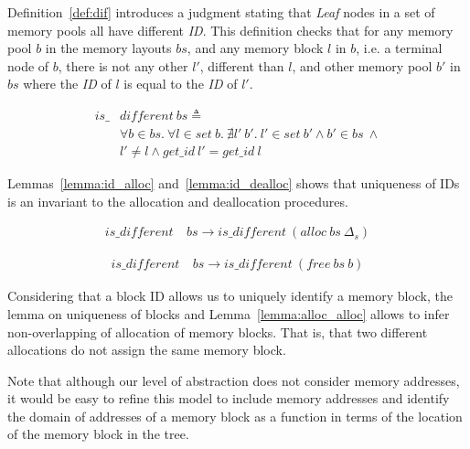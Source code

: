 Definition~\ref{def:dif} introduces a judgment stating that \emph{Leaf} nodes in a set of memory pools all have different \emph{ID}. This definition checks that for any memory pool $b$ in the memory layouts $bs$, and any memory block $l$ in $b$, i.e. a terminal node of $b$, there is not any other $l'$, different than $l$, and other memory pool $b'$ in $bs$ where the \emph{ID} of $l$ is equal to the \emph{ID} of $l'$.

\begin{definition} 
\label{def:dif}
\end{definition}
\vspace{-7pt}
\begin{align*}
is\_&different\ bs \triangleq\\
&\forall b \in bs.\ \forall l \in set\ b.\ \nexists l'\ b'.\ l' \in set\ b' \wedge b' \in bs\ \wedge\\
&l' \ne l \wedge get\_id\ l' = get\_id\ l
\end{align*}
\vspace{-12pt}

Lemmas~\ref{lemma:id_alloc} and~\ref{lemma:id_dealloc} shows that uniqueness of IDs is an invariant to the allocation and deallocation procedures.

\begin{lemma}  \label{lemma:id_alloc}
\begin{align*}
is\_different\ &bs \longrightarrow is\_different\ (alloc\ bs\ \Delta_s)
\end{align*}
\end{lemma}

\begin{lemma}  \label{lemma:id_dealloc}
\begin{align*}
is\_different\ &bs \longrightarrow is\_different\ (free\ bs\ b)
\end{align*}
\end{lemma}

Considering that a block ID allows us to uniquely identify a memory block, the lemma on uniqueness of blocks and Lemma~\ref{lemma:alloc_alloc} allows to infer non-overlapping of allocation of memory blocks. That is, that two different allocations do not assign the same memory block.

Note that although our level of abstraction does not consider memory addresses, it would be easy to refine this model to include memory addresses and identify the domain of addresses of a memory block as a function in terms of the location of the memory block in the tree.

